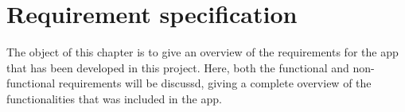 \chapter{Requirement specification}
\label{sec:recSpecification}

The object of this chapter is to give an overview of the requirements for the app that has been developed in this project. Here, both the functional and non-functional requirements will be discussd, giving a complete overview of the functionalities that was included in the app.



\newpage
